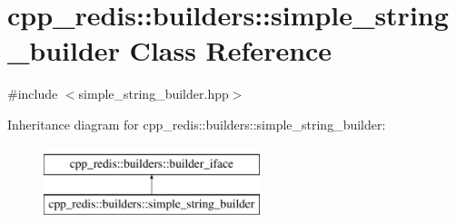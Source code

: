 \hypertarget{classcpp__redis_1_1builders_1_1simple__string__builder}{}\section{cpp\+\_\+redis\+:\+:builders\+:\+:simple\+\_\+string\+\_\+builder Class Reference}
\label{classcpp__redis_1_1builders_1_1simple__string__builder}


{\ttfamily \#include $<$simple\+\_\+string\+\_\+builder.\+hpp$>$}

Inheritance diagram for cpp\+\_\+redis\+:\+:builders\+:\+:simple\+\_\+string\+\_\+builder\+:\begin{figure}[H]
\begin{center}
\leavevmode
\includegraphics[height=2.000000cm]{classcpp__redis_1_1builders_1_1simple__string__builder}
\end{center}
\end{figure}
